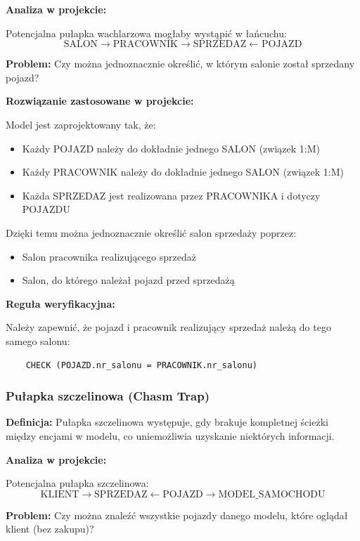 \documentclass[a4paper,titleauthor]{mwart}
\begin{document}
	\textbf{Analiza w projekcie:}
	
	Potencjalna pułapka wachlarzowa mogłaby wystąpić w łańcuchu:
	$$\text{SALON} \rightarrow \text{PRACOWNIK} \rightarrow \text{SPRZEDAZ} \leftarrow \text{POJAZD}$$
	
	\textbf{Problem:} Czy można jednoznacznie określić, w którym salonie został sprzedany pojazd?
	
	\textbf{Rozwiązanie zastosowane w projekcie:}
	
	Model jest zaprojektowany tak, że:
	\begin{itemize}
		\item Każdy POJAZD należy do dokładnie jednego SALON (związek 1:M)
		\item Każdy PRACOWNIK należy do dokładnie jednego SALON (związek 1:M)
		\item Każda SPRZEDAZ jest realizowana przez PRACOWNIKA i dotyczy POJAZDU
	\end{itemize}
	
	Dzięki temu można jednoznacznie określić salon sprzedaży poprzez:
	\begin{itemize}
		\item Salon pracownika realizującego sprzedaż
		\item Salon, do którego należał pojazd przed sprzedażą
	\end{itemize}
	
	\textbf{Reguła weryfikacyjna:}
	
	Należy zapewnić, że pojazd i pracownik realizujący sprzedaż należą do tego samego salonu:
	
	\begin{verbatim}
	CHECK (POJAZD.nr_salonu = PRACOWNIK.nr_salonu)
	\end{verbatim}
	
	\subsubsection{Pułapka szczelinowa (Chasm Trap)}
	
	\textbf{Definicja:} Pułapka szczelinowa występuje, gdy brakuje kompletnej ścieżki między encjami w modelu, co uniemożliwia uzyskanie niektórych informacji.
	
	\textbf{Analiza w projekcie:}
	
	Potencjalna pułapka szczelinowa:
	$$\text{KLIENT} \rightarrow \text{SPRZEDAZ} \leftarrow \text{POJAZD} \rightarrow \text{MODEL\_SAMOCHODU}$$
	
	\textbf{Problem:} Czy można znaleźć wszystkie pojazdy danego modelu, które oglądał klient (bez zakupu)?
	
\end{document}
